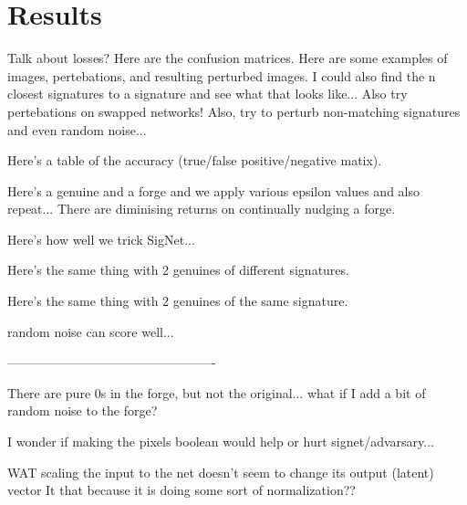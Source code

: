 \section{Results}\label{sec:results}

Talk about losses?
Here are the confusion matrices.
Here are some examples of images, pertebations, and resulting perturbed images.
I could also find the n closest signatures to a signature and see what that looks like...
Also try pertebations on swapped networks!
Also, try to perturb non-matching signatures and even random noise...

Here's a table of the accuracy (true/false positive/negative matix).

Here's a genuine and a forge and we apply various epsilon values and also repeat...
    There are diminising returns on continually nudging a forge.

Here's how well we trick SigNet...

Here's the same thing with 2 genuines of different signatures.

Here's the same thing with 2 genuines of the same signature.



random noise can score well...

-------------------------------------------------

There are pure 0s in the forge, but not the original...
what if I add a bit of random noise to the forge?

I wonder if making the pixels boolean would help or hurt signet/advarsary...





WAT
    scaling the input to the net doesn't seem to change its output (latent) vector
    It that because it is doing some sort of normalization??
